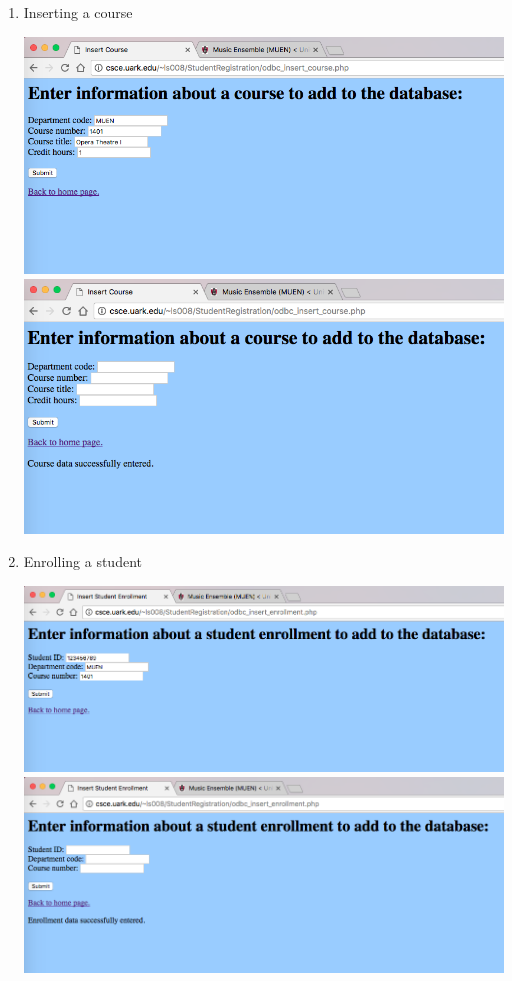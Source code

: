 \documentclass{article}      %
\begin{document}
\begin{enumerate}
\item Inserting a course

	\includegraphics[width=\textwidth]{InsertCourseBefore}
	\includegraphics[width=\textwidth]{InsertCourseAfter}


\item Enrolling a student

	\includegraphics[width=\textwidth]{InsertEnrollmentBefore}
	\includegraphics[width=\textwidth]{InsertEnrollmentAfter}



\end{enumerate}
\end{document}
